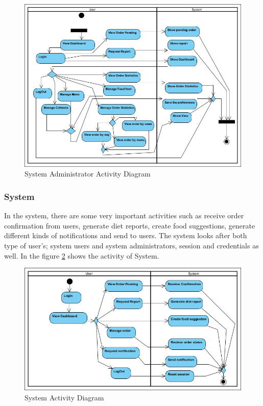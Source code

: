 \begin{figure}[h!t]
    \centering
      \includegraphics[width=5.5in]{ch3/ActivityDiagram/SysAdmin}
  \caption{System Administrator Activity Diagram}
  \label{AdministratorActivityDiagram}
\end{figure}

\subsubsection{System} In the system, there are some very important activities such
as receive order confirmation from users, generate diet reports, create food
suggestions, generate different kinds of notifications and send to users. The
system looks after both type of user's; system users and system administrators,
session and credentials as well. In the figure \ref{SystemActivityDiagram} shows
the activity of System.
\begin{figure}[h!t]
    \centering
      \includegraphics[width=5.5in]{ch3/ActivityDiagram/SysApp}
  \caption{System Activity Diagram}
  \label{SystemActivityDiagram}
\end{figure}

